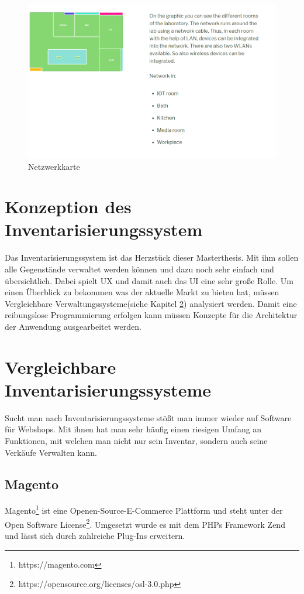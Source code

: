 \begin{figure}[bh]
	\centering
	\includegraphics[scale=0.35]{content/pictures/network.png}
	\caption{Netzwerkkarte}
	\label{fig:network}
\end{figure}

\section{Konzeption des Inventarisierungssystem}
\label{konzept:inventar}
Das Inventarisierungssystem ist das Herzstück dieser Masterthesis. Mit ihm sollen alle Gegenstände verwaltet werden können und dazu noch sehr einfach und übersichtlich. Dabei spielt \acf{UX} und damit auch das \acf{UI} eine sehr große Rolle. Um einen Überblick zu bekommen was der aktuelle Markt zu bieten hat, müssen Vergleichbare Verwaltungssysteme(siehe Kapitel \ref{konzept:vergleich}) analysiert werden. Damit eine reibungslose Programmierung erfolgen kann müssen Konzepte für die Architektur der Anwendung ausgearbeitet werden.


\section{Vergleichbare Inventarisierungssysteme}
\label{konzept:vergleich}

Sucht man nach Inventarisierungssysteme stößt man immer wieder auf Software für Webshops. Mit ihnen hat man sehr häufig einen riesigen Umfang an Funktionen, mit welchen man nicht nur sein Inventar, sondern auch seine Verkäufe Verwalten kann.

\subsection{Magento}
\label{konzeption:magento}
Magento\footnote{https://magento.com} ist eine Openen-Source-E-Commerce Plattform und steht unter der Open Software License\footnote{https://opensource.org/licenses/osl-3.0.php}. Umgesetzt wurde es mit dem \acp{PHP} Framework Zend und lässt sich durch zahlreiche Plug-Ins erweitern.\autocite{.2018}

